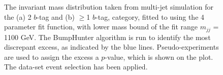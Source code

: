 \begin{figure}[!ht]
  \begin{center}
   \captionsetup[subfigure]{aboveskip=0pt,justification=centering}
  \end{center}
  \caption{ The invariant mass distribution taken from multi-jet simulation for the (a) 2 $b$-tag and (b) $\geq$1 $b$-tag,
   category, fitted to using the 4 parameter fit function, with lower mass bound of the fit range $m_{jj}$ = 1100 GeV.
   The BumpHunter algorithm is run to identify the most discrepant excess, as indicated by the blue lines.
   Pseudo-experiments are used to assign the excess a $p$-value, which is shown on the plot.    
   The \summer{} data-set event selection has been applied.}
 \label{fig:Short_4para_1100_figure1}
\end{figure}


